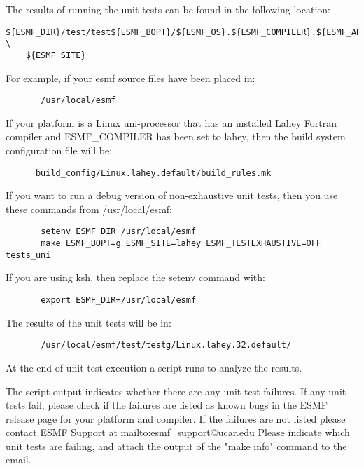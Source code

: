 The results of running the unit tests can be found in the following location:
\begin{verbatim}
${ESMF_DIR}/test/test${ESMF_BOPT}/${ESMF_OS}.${ESMF_COMPILER}.${ESMF_ABI}. \
	${ESMF_SITE}
\end{verbatim}

For example, if your esmf source files have been placed in: 
\begin{verbatim}
       /usr/local/esmf
\end{verbatim}

If your platform is a Linux uni-processor that has an installed Lahey
Fortran compiler and ESMF\_COMPILER has been set to lahey, then the build
system configuration file will be:

\begin{verbatim}
      build_config/Linux.lahey.default/build_rules.mk
\end{verbatim}

If you want to run a debug version of non-exhaustive unit tests,
then you use these commands from /usr/local/esmf:

\begin{verbatim}
       setenv ESMF_DIR /usr/local/esmf
       make ESMF_BOPT=g ESMF_SITE=lahey ESMF_TESTEXHAUSTIVE=OFF tests_uni
\end{verbatim}


If you are using ksh, then replace the setenv command with:
\begin{verbatim}
       export ESMF_DIR=/usr/local/esmf
\end{verbatim}

The results of the unit tests will be in:
\begin{verbatim}
       /usr/local/esmf/test/testg/Linux.lahey.32.default/
\end{verbatim}

At the end of unit test execution a script runs to analyze the results.

The script output indicates whether there are any unit test failures.
If any unit tests fail, please check if the failures are listed as known bugs in the ESMF release
page 
for your platform and compiler.
If the failures are not listed please contact ESMF Support at 
{mailto:esmf\_support@ucar.edu}
Please indicate which unit tests are failing, and attach the output of the "make info" command to the email.


